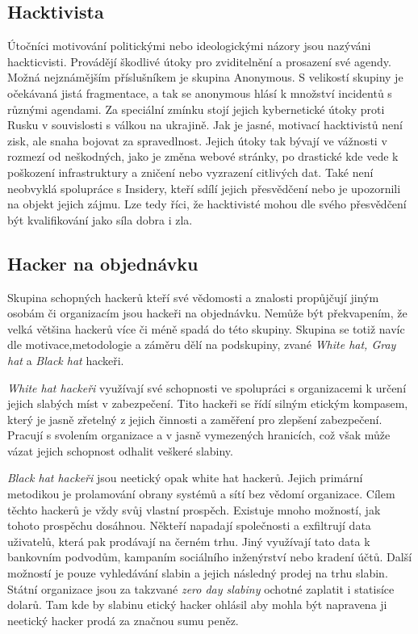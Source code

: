 \subsection{Hacktivista}\label{subsec:hacktivista}
Útočníci motivování politickými nebo ideologickými názory jsou nazýváni hackticvisti.
Provádějí škodlivé útoky pro zviditelnění a prosazení své agendy.
Možná nejznámějším příslušníkem je skupina Anonymous.
S velikostí skupiny je očekávaná jistá fragmentace, a tak se anonymous hlásí k množství incidentů s různými agendami.
Za speciální zmínku stojí jejich kybernetické útoky proti Rusku v souvislosti s válkou na ukrajině\cite{anonymous_russian_attacks}.
Jak je jasné, motivací hacktivistů není zisk, ale snaha bojovat za spravedlnost.
Jejich útoky tak bývají ve vážnosti v rozmezí od neškodných, jako je změna webové stránky, po drastické kde vede k poškození infrastruktury a zničení nebo vyzrazení citlivých dat.
Také není neobvyklá spolupráce s Insidery, kteří sdílí jejich přesvědčení nebo je upozornili na objekt jejich zájmu.
Lze tedy říci, že hacktivisté mohou dle svého přesvědčení být kvalifikování jako síla dobra i zla.


\subsection{Hacker na objednávku}\label{subsec:hacker-na-objednavku}
Skupina schopných hackerů kteří své vědomosti a znalosti propůjčují jiným osobám či organizacím jsou hackeři na objednávku.
Nemůže být překvapením, že velká většina hackerů více či méně spadá do této skupiny.
Skupina se totiž navíc dle motivace,metodologie a záměru dělí na podskupiny, zvané \textit{White hat, Gray hat} a \textit{Black hat} hackeři.

\textit{White hat hackeři} využívají své schopnosti ve spolupráci s organizacemi k určení jejich slabých míst v zabezpečení.
Tito hackeři se řídí silným etickým kompasem, který je jasně zřetelný z jejich činnosti a zaměření pro zlepšení zabezpečení.
Pracují s svolením organizace a v jasně vymezených hranicích, což však může vázat jejich schopnost odhalit veškeré slabiny.

\textit{Black hat hackeři} jsou neetický opak white hat hackerů.
Jejich primární metodikou je prolamování obrany systémů a sítí bez vědomí organizace.
Cílem těchto hackerů je vždy svůj vlastní prospěch.
Existuje mnoho možností, jak tohoto prospěchu dosáhnou.
Někteří napadají společnosti a exfiltrují data uživatelů, která pak prodávají na černém trhu.
Jiný využívají tato data k bankovním podvodům, kampaním sociálního inženýrství nebo kradení účtů.
Další možností je pouze vyhledávání slabin a jejich následný prodej na trhu slabin.
Státní organizace jsou za takzvané \textit{zero day slabiny} ochotné zaplatit i statisíce dolarů\cite{world_end_2021}.
Tam kde by slabinu etický hacker ohlásil aby mohla být napravena ji neetický hacker prodá za značnou sumu peněz.

